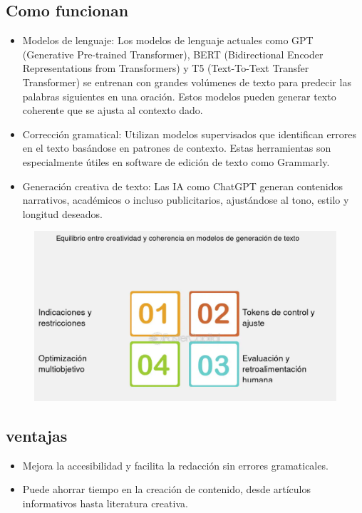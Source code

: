 \documentclass[12pt]{article}
\begin{document}
\subsection{Como funcionan}
\begin{itemize}
    \item Modelos de lenguaje: 
    Los modelos de lenguaje actuales como GPT (Generative Pre-trained Transformer), BERT (Bidirectional Encoder Representations from Transformers)
    y T5 (Text-To-Text Transfer Transformer) se entrenan con grandes volúmenes de texto para predecir las palabras siguientes en una oración. 
    Estos modelos pueden generar texto coherente que se ajusta al contexto dado.
    \item Corrección gramatical:
    Utilizan modelos supervisados que identifican errores en el texto basándose en patrones de contexto. Estas herramientas son especialmente 
    útiles en software de edición de texto como Grammarly.
    \item Generación creativa de texto:
    Las IA como ChatGPT generan contenidos narrativos, académicos o incluso publicitarios, ajustándose al tono, estilo y longitud deseados.
\end{itemize}

\begin{figure}[h!]
    \centering
    \includegraphics[width=.6\textwidth]{generacionCreativa.PNG}
    \label{fig:my_label}
\end{figure}

\subsection{ventajas}
\begin{itemize}
    \item Mejora la accesibilidad y facilita la redacción sin errores gramaticales.
    \item Puede ahorrar tiempo en la creación de contenido, desde artículos informativos hasta literatura creativa.
\end{itemize}
\end{document}
